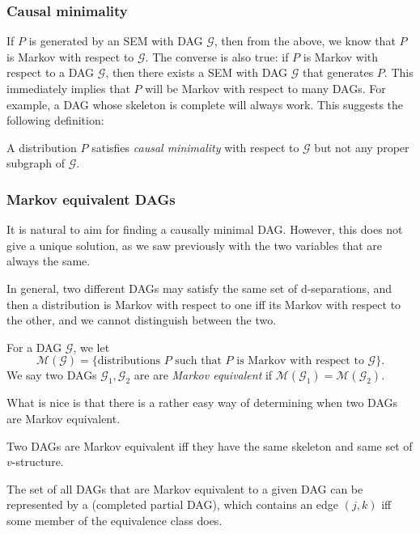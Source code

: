\documentclass[a4paper]{article}
\begin{document}
\subsubsection*{Causal minimality}
If $P$ is generated by an SEM with DAG $\mathcal{G}$, then from the above, we know that $P$ is Markov with respect to $\mathcal{G}$. The converse is also true: if $P$ is Markov with respect to a DAG $\mathcal{G}$, then there exists a SEM with DAG $\mathcal{G}$ that generates $P$. This immediately implies that $P$ will be Markov with respect to many DAGs. For example, a DAG whose skeleton is complete will always work. This suggests the following definition:

\begin{defi}
  A distribution $P$ satisfies \emph{causal minimality} with respect to $\mathcal{G}$ but not any proper subgraph of $\mathcal{G}$.
\end{defi}

\subsubsection*{Markov equivalent DAGs}

It is natural to aim for finding a causally minimal DAG. However, this does not give a unique solution, as we saw previously with the two variables that are always the same.

In general, two different DAGs may satisfy the same set of d-separations, and then a distribution is Markov with respect to one iff its Markov with respect to the other, and we cannot distinguish between the two.

\begin{defi}
  For a DAG $\mathcal{G}$, we let
  \[
    \mathcal{M}(\mathcal{G}) = \{\text{distributions $P$ such that $P$ is Markov with respect to $\mathcal{G}$}\}.
  \]
  We say two DAGs $\mathcal{G}_1, \mathcal{G}_2$ are are \emph{Markov equivalent} if $\mathcal{M}(\mathcal{G}_1) = \mathcal{M}(\mathcal{G}_2)$.
\end{defi}
What is nice is that there is a rather easy way of determining when two DAGs are Markov equivalent.

\begin{prop}
  Two DAGs are Markov equivalent iff they have the same skeleton and same set of $v$-structure.
\end{prop}
The set of all DAGs that are Markov equivalent to a given DAG can be represented by a  (completed partial DAG), which contains an edge $(j, k)$ iff some member of the equivalence class does.
\end{document}
